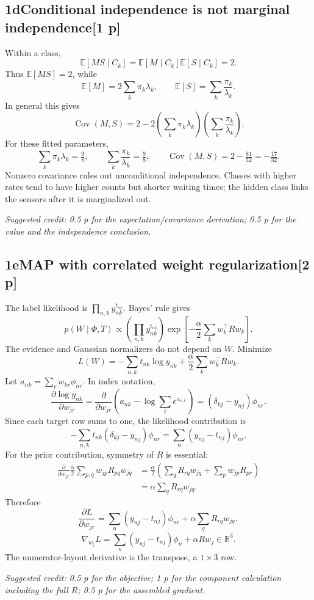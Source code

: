 \documentclass[11pt,a4paper]{article}
\newcommand{\R}{\mathbb R}
\newcommand{\E}{\mathbb E}
\DeclareMathOperator{\Cov}{Cov}
\newcommand{\solution}[3]{\Needspace{6\baselineskip}\subsection*{\color{examblue}#1\quad #2\hfill\normalsize[#3 p]}}
\newcommand{\selfcredit}[1]{\par\textit{Suggested credit: #1}\par}
\begin{document}
\solution{1d}{Conditional independence is not marginal independence}{1}
Within a class,
\[
\E[MS\mid C_k]=\E[M\mid C_k]\E[S\mid C_k]=2.
\]
Thus $\E[MS]=2$, while
\[
\E[M]=2\sum_k\pi_k\lambda_k,
\qquad \E[S]=\sum_k\frac{\pi_k}{\lambda_k}.
\]
In general this gives
\[
\boxed{\Cov(M,S)=2-2\left(\sum_k\pi_k\lambda_k\right)
\left(\sum_k\frac{\pi_k}{\lambda_k}\right)}.
\]
For these fitted parameters,
\[
\sum_k\pi_k\lambda_k=\tfrac98,\qquad
\sum_k\frac{\pi_k}{\lambda_k}=\tfrac98,
\qquad \boxed{\Cov(M,S)=2-\tfrac{81}{32}=-\tfrac{17}{32}}.
\]
Nonzero covariance rules out unconditional independence. Classes with higher
rates tend to have higher counts but shorter waiting times; the hidden class
links the sensors after it is marginalized out.
\selfcredit{0.5 p for the expectation/covariance derivation; 0.5 p for the value and the independence conclusion.}

\solution{1e}{MAP with correlated weight regularization}{2}
The label likelihood is $\prod_{n,k}y_{nk}^{t_{nk}}$. Bayes' rule gives
\[
p(W\mid\Phi,T)\propto
\left(\prod_{n,k}y_{nk}^{t_{nk}}\right)
\exp\!\left[-\frac\alpha2\sum_kw_k^\top Rw_k\right].
\]
The evidence and Gaussian normalizers do not depend on $W$. Minimize
\[
\boxed{L(W)=-\sum_{n,k}t_{nk}\log y_{nk}
+\frac\alpha2\sum_kw_k^\top Rw_k}.
\]
Let $a_{nk}=\sum_rw_{kr}\phi_{nr}$. In index notation,
\[
\frac{\partial\log y_{nk}}{\partial w_{jr}}
=\frac{\partial}{\partial w_{jr}}
\left(a_{nk}-\log\sum_\ell e^{a_{n\ell}}\right)
=(\delta_{kj}-y_{nj})\phi_{nr}.
\]
Since each target row sums to one, the likelihood contribution is
\[
-\sum_{n,k}t_{nk}(\delta_{kj}-y_{nj})\phi_{nr}
=\sum_n(y_{nj}-t_{nj})\phi_{nr}.
\]
For the prior contribution, symmetry of $R$ is essential:
\begin{align*}
\frac{\partial}{\partial w_{jr}}\frac\alpha2
\sum_{p,q}w_{jp}R_{pq}w_{jq}
&=\frac\alpha2\left(\sum_qR_{rq}w_{jq}+\sum_pw_{jp}R_{pr}\right)\\
&=\alpha\sum_qR_{rq}w_{jq}.
\end{align*}
Therefore
\[
\boxed{\frac{\partial L}{\partial w_{jr}}
=\sum_n(y_{nj}-t_{nj})\phi_{nr}+\alpha\sum_qR_{rq}w_{jq}},
\]
\[
\boxed{\nabla_{w_j}L=\sum_n(y_{nj}-t_{nj})\phi_n+\alpha Rw_j\in\R^3}.
\]
The numerator-layout derivative is the transpose, a $1\times3$ row.
\selfcredit{0.5 p for the objective; 1 p for the component calculation including the full $R$; 0.5 p for the assembled gradient.}
\end{document}
